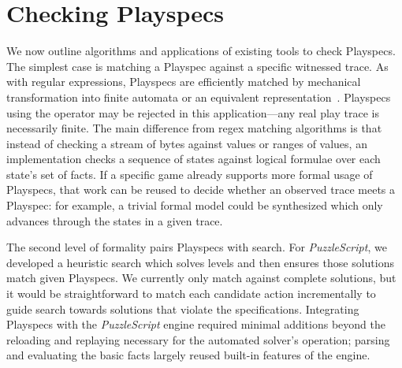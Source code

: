 \documentclass[letterpaper]{article}
\newcommand{\syntax}[1]{\texttt{\detokenize{#1}}}
\begin{document}
\section{Checking Playspecs}
\label{sec:checkingplayspecs}

\noindent We now outline algorithms and applications of existing tools to check Playspecs. The simplest case is matching a Playspec against a specific witnessed trace. As with regular expressions, Playspecs are efficiently matched by mechanical transformation into finite automata or an equivalent representation~\cite{Thompson:1968:PTR:363347.363387,cox2011implementing}. Playspecs using the \syntax{***} operator may be rejected in this application---any real play trace is necessarily finite. The main difference from regex matching algorithms is that instead of checking a stream of bytes against values or ranges of values, an implementation checks a sequence of states against logical formulae over each state's set of facts. If a specific game already supports more formal usage of Playspecs, that work can be reused to decide whether an observed trace meets a Playspec: for example, a trivial formal model could be synthesized which only advances through the states in a given trace.

The second level of formality pairs Playspecs with search. For \emph{PuzzleScript}, we developed a heuristic search which solves levels and then ensures those solutions match given Playspecs. We currently only match against complete solutions, but it would be straightforward to match each candidate action incrementally to guide search towards solutions that violate the specifications. Integrating Playspecs with the \emph{PuzzleScript} engine required minimal additions beyond the reloading and replaying necessary for the automated solver's operation; parsing and evaluating the basic facts largely reused built-in features of the engine.
\end{document}
